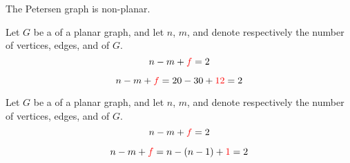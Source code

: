 \begin{frame}{}
  \begin{theorem}
    The Petersen graph is non-planar.
  \end{theorem}

  \pause
  \begin{center}
  \end{center}
\end{frame}

\begin{frame}{}
  \begin{center}
  \end{center}
\end{frame}

\begin{frame}{}
  \begin{theorem}
    Let $G$ be a  of a  planar graph,
    and let $n$, $m$, and  denote respectively the number of vertices,
    edges, and  of $G$.
    \[
      n - m + \textcolor{red}{f} = 2
    \]
  \end{theorem}

  \pause
  \pause
  \[
    n - m + \textcolor{red}{f} = 20 - 30 + \textcolor{red}{12} = 2
  \]
\end{frame}

\begin{frame}{}
  \begin{theorem}
    Let $G$ be a  of a  planar graph,
    and let $n$, $m$, and  denote respectively the number of vertices,
    edges, and  of $G$.
    \[
      n - m + \textcolor{red}{f} = 2
    \]
  \end{theorem}

  \pause
  \pause
  \[
    n - m + \textcolor{red}{f} = n - (n - 1) + \textcolor{red}{1} = 2
  \]
\end{frame}

